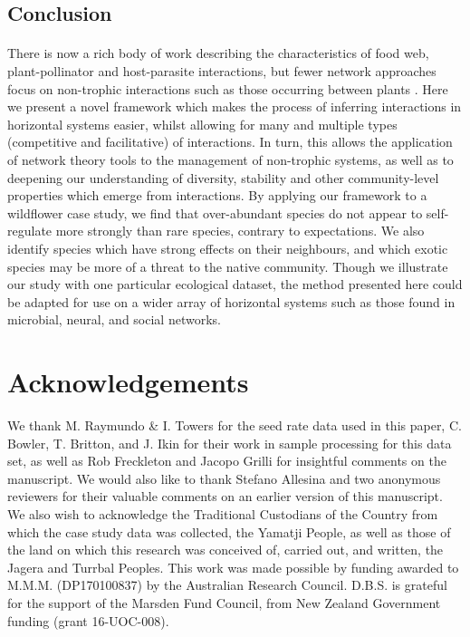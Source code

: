 \documentclass[a4,12pt]{article}
\begin{document}
\subsection{Conclusion}

    \paragraph{} 
    There is now a rich body of work describing the characteristics of food web, plant-pollinator and host-parasite interactions, but fewer network approaches focus on non-trophic interactions such as those occurring between plants \parencite{Ellison2019}. Here we present a novel framework which makes the process of inferring  interactions in horizontal systems easier, whilst allowing for many and multiple types (competitive and facilitative) of interactions. In turn, this allows the application of  network theory tools to the management of non-trophic systems, as well as to deepening our understanding of diversity, stability and other community-level properties which emerge from interactions. By applying our framework to a wildflower case study, we find that over-abundant species do not appear to self-regulate more strongly than rare species, contrary to expectations. We also identify species which have strong effects on their neighbours, and which exotic species may be more of a threat to the native community. Though we illustrate our study with one particular ecological dataset, the method presented here could be adapted for use on a wider array of  horizontal systems such as those found in microbial, neural, and social networks. 
   

% 
% 

\section*{Acknowledgements}

We thank M. Raymundo \& I. Towers for the seed rate data used in this paper, C. Bowler, T. Britton, and J. Ikin for their work in sample processing for this data set, as well as Rob Freckleton and Jacopo Grilli for insightful comments on the manuscript. We would also like to thank Stefano Allesina and two anonymous reviewers for their valuable comments on an earlier version of this manuscript. We also wish to acknowledge the Traditional Custodians of the Country from which the case study data was collected, the Yamatji People, as well as those of the land on which this research was conceived of, carried out, and written, the Jagera and Turrbal Peoples. This work was made possible by funding awarded to M.M.M. (DP170100837) by the Australian Research Council. D.B.S. is grateful for the support of the Marsden Fund Council, from New Zealand Government funding (grant 16-UOC-008).
\end{document}
